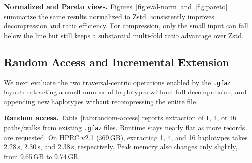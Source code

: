 \begin{table}[t]
  \centering
  \scriptsize
  \setlength{\tabcolsep}{5pt}
  \renewcommand{\arraystretch}{1.05}
  \caption{Incremental haplotype extension using \texttt{add-haplotypes}. Each run appends 50 new paths/walks using the rulebook already stored in the input \texttt{.gfaz} file.}
  \label{tab:incremental-extension}
\end{table}




\noindent \textbf{Normalized and Pareto views.}
Figures~\ref{fig:eval-norm} and~\ref{fig:pareto} summarize the same results normalized to Zstd. \gfaz consistently improves decompression and ratio efficiency.
For compression, only the small input can fall below the line but still keeps a substantial multi-fold ratio advantage over Zstd.



\subsection{Random Access and Incremental Extension}\label{subsec:random-access-eval}

We next evaluate the two traversal-centric operations enabled by the \texttt{.gfaz} layout: extracting a small number of haplotypes without full decompression, and appending new haplotypes without recompressing the entire file.

\noindent \textbf{Random access.}
Table~\ref{tab:random-access} reports extraction of 1, 4, or 16 paths/walks from existing \texttt{.gfaz} files. Runtime stays nearly flat as more records are requested. On HPRC v2.1 (369\,GB), extracting 1, 4, and 16 haplotypes takes 2.28\,s, 2.30\,s, and 2.38\,s, respectively. Peak memory also changes only slightly, from 9.65\,GB to 9.74\,GB.

